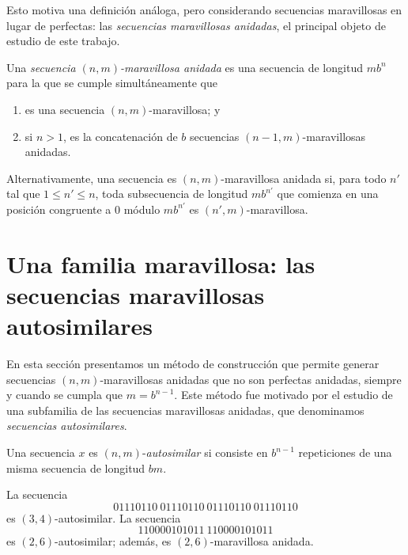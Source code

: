 Esto motiva una definición análoga, pero considerando secuencias maravillosas en
lugar de perfectas: las \emph{secuencias maravillosas anidadas}, el principal
objeto de estudio de este trabajo.

\begin{definition}
	Una \emph{secuencia $(n,m)$-maravillosa anidada} es una secuencia de
	longitud $m b^n$ para la que se cumple simultáneamente que
	\begin{enumerate}
		\item es una secuencia $(n,m)$-maravillosa; y
		\item si $n > 1$, es la concatenación de $b$ secuencias
		      $(n-1,m)$-maravillosas anidadas.
	\end{enumerate}

	Alternativamente, una secuencia es $(n,m)$-maravillosa anidada si, para todo
	$n'$ tal que $1 \leq n' \leq n$, toda subsecuencia de longitud
	$m b^{n'}$ que comienza en una posición congruente a $0$ módulo
	$m b^{n'}$ es $(n',m)$-maravillosa.
\end{definition}



\newpage

\chapter{Una familia maravillosa: las secuencias maravillosas autosimilares}
\label{chapter:autosimilar-sequences}

En esta sección presentamos un método de construcción que permite generar
secuencias $(n,m)$-maravillosas anidadas que no son perfectas anidadas, siempre
y cuando se cumpla que $m = b^{n - 1}$.
Este método fue motivado por el estudio de una subfamilia de las secuencias
maravillosas anidadas, que denominamos \emph{secuencias autosimilares}.

\begin{definition}
	Una secuencia $x$ es $(n,m)$-\emph{autosimilar} si consiste en $b^{n-1}$
	repeticiones de una misma secuencia de longitud $bm$.
\end{definition}

\begin{example}
	La secuencia \[ 01110110\ 01110110\ 01110110\ 01110110 \] es
	$(3,4)$-autosimilar.
	La secuencia \[ 110000101011 \ 110000101011 \] es $(2,6)$-autosimilar; además,
	es $(2,6)$-maravillosa anidada.
\end{example}


